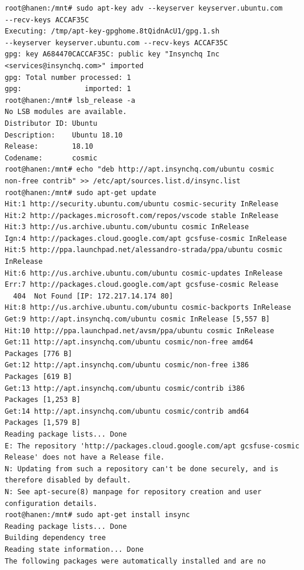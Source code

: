 \begin{verbatim}
root@hanen:/mnt# sudo apt-key adv --keyserver keyserver.ubuntu.com 
--recv-keys ACCAF35C
Executing: /tmp/apt-key-gpghome.8tQidnAcU1/gpg.1.sh 
--keyserver keyserver.ubuntu.com --recv-keys ACCAF35C
gpg: key A684470CACCAF35C: public key "Insynchq Inc 
<services@insynchq.com>" imported
gpg: Total number processed: 1
gpg:               imported: 1
root@hanen:/mnt# lsb_release -a
No LSB modules are available.
Distributor ID: Ubuntu
Description:    Ubuntu 18.10
Release:        18.10
Codename:       cosmic
root@hanen:/mnt# echo "deb http://apt.insynchq.com/ubuntu cosmic 
non-free contrib" >> /etc/apt/sources.list.d/insync.list
root@hanen:/mnt# sudo apt-get update
Hit:1 http://security.ubuntu.com/ubuntu cosmic-security InRelease
Hit:2 http://packages.microsoft.com/repos/vscode stable InRelease                                          
Hit:3 http://us.archive.ubuntu.com/ubuntu cosmic InRelease                                                 
Ign:4 http://packages.cloud.google.com/apt gcsfuse-cosmic InRelease                                        
Hit:5 http://ppa.launchpad.net/alessandro-strada/ppa/ubuntu cosmic 
InRelease                   
Hit:6 http://us.archive.ubuntu.com/ubuntu cosmic-updates InRelease                                         
Err:7 http://packages.cloud.google.com/apt gcsfuse-cosmic Release                                          
  404  Not Found [IP: 172.217.14.174 80]
Hit:8 http://us.archive.ubuntu.com/ubuntu cosmic-backports InRelease                                       
Get:9 http://apt.insynchq.com/ubuntu cosmic InRelease [5,557 B]                                            
Hit:10 http://ppa.launchpad.net/avsm/ppa/ubuntu cosmic InRelease                                           
Get:11 http://apt.insynchq.com/ubuntu cosmic/non-free amd64 
Packages [776 B]
Get:12 http://apt.insynchq.com/ubuntu cosmic/non-free i386 
Packages [619 B]
Get:13 http://apt.insynchq.com/ubuntu cosmic/contrib i386 
Packages [1,253 B]
Get:14 http://apt.insynchq.com/ubuntu cosmic/contrib amd64 
Packages [1,579 B]
Reading package lists... Done      
E: The repository 'http://packages.cloud.google.com/apt gcsfuse-cosmic 
Release' does not have a Release file.
N: Updating from such a repository can't be done securely, and is 
therefore disabled by default.
N: See apt-secure(8) manpage for repository creation and user 
configuration details.
root@hanen:/mnt# sudo apt-get install insync
Reading package lists... Done
Building dependency tree       
Reading state information... Done
The following packages were automatically installed and are no 

\end{verbatim}
